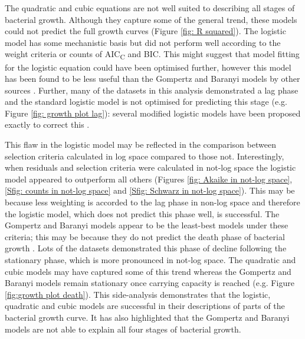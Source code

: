 \documentclass[11pt]{article}
\begin{document}
\begin{linenumbers}
        The quadratic and cubic equations are not well suited to describing all stages of bacterial growth. Although they capture some of the general trend, these models could not predict the full growth curves (Figure \ref{fig: R squared}). The logistic model has some mechanistic basis but did not perform well according to the weight criteria or counts of AIC\textsubscript{C} and BIC. This might suggest that model fitting for the logistic equation could have been optimised further, however this model has been found to be less useful than the Gompertz and Baranyi models by other sources \citep{peleg_modeling_1997, mckellar_primary_2003}. Further, many of the datasets in this analysis demonstrated a lag phase and the standard logistic model is not optimised for predicting this stage (e.g. Figure \ref{fig: growth plot lag}): several modified logistic models have been proposed exactly to correct this \citep[e.g.][]{fujikawa_new_2004}. 

        This flaw in the logistic model may be reflected in the comparison between selection criteria calculated in log space compared to those not. Interestingly, when residuals and selection criteria were calculated in not-log space the logistic model appeared to outperform all others (Figures \ref{fig: Akaike in not-log space}, \ref{Sfig: counts in not-log space} and \ref{Sfig: Schwarz in not-log space}). This may be because less weighting is accorded to the lag phase in non-log space and therefore the logistic model, which does not predict this phase well, is successful. The Gompertz and Baranyi models appear to be the least-best models under these criteria; this may be because they do not predict the death phase of bacterial growth \citep{salazar_primary_2021}. Lots of the datasets demonstrated this phase of decline following the stationary phase, which is more pronounced in not-log space. The quadratic and cubic models may have captured some of this trend whereas the Gompertz and Baranyi models remain stationary once carrying capacity is reached (e.g. Figure \ref{fig:growth plot death}). This side-analysis demonstrates that the logistic, quadratic and cubic models are successful in their descriptions of parts of the bacterial growth curve. It has also highlighted that the Gompertz and Baranyi models are not able to explain all four stages of bacterial growth.


\end{linenumbers}
\end{document}
